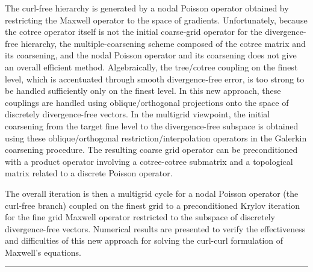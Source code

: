 \documentclass[twosided]{report}
\begin{document}
The
curl-free hierarchy is generated by a nodal Poisson operator
obtained by restricting the Maxwell operator to the space of
gradients. Unfortunately, because the cotree operator itself
is not the initial coarse-grid operator for the
divergence-free hierarchy, the multiple-coarsening scheme
composed of the cotree matrix and its coarsening, and the
nodal Poisson operator and its coarsening does not give an
overall efficient method. Algebraically, the tree/cotree
coupling on the finest level, which is accentuated through
smooth divergence-free error, is too strong to be handled
sufficiently only on the finest level. In this new approach,
these couplings are handled using oblique/orthogonal
projections onto the space of discretely divergence-free
vectors. In the multigrid viewpoint, the initial coarsening
from the target fine level to the divergence-free subspace
is obtained using these oblique/orthogonal
restriction/interpolation operators in the Galerkin
coarsening procedure. The resulting coarse grid operator can
be preconditioned with a product operator involving a
cotree-cotree submatrix and a topological matrix related to
a discrete Poisson operator.

The overall iteration is then a
multigrid cycle for a nodal Poisson operator (the curl-free
branch) coupled on the finest grid to a preconditioned
Krylov iteration for the fine grid Maxwell operator
restricted to the subspace of discretely divergence-free
vectors. Numerical results are presented to verify the
effectiveness and difficulties of this new approach for
solving the curl-curl formulation of Maxwell's equations.



	\begin{center} \rule{6in}{1pt} \end{center}
\end{document}
